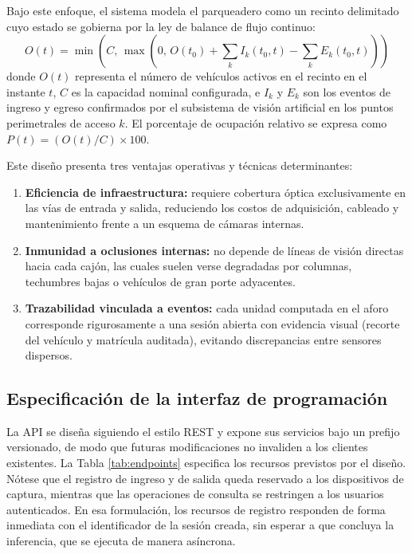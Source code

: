 Bajo este enfoque, el sistema modela el parqueadero como un recinto delimitado
cuyo estado se gobierna por la ley de balance de flujo continuo:
\begin{equation}
    O(t) = \min\left(C,\, \max\left(0,\, O(t_0) + \sum_{k} I_k(t_0, t) - \sum_{k} E_k(t_0, t)\right)\right)
\end{equation}
donde $O(t)$ representa el número de vehículos activos en el recinto en el
instante $t$, $C$ es la capacidad nominal configurada, e $I_k$ y $E_k$ son los
eventos de ingreso y egreso confirmados por el subsistema de visión artificial
en los puntos perimetrales de acceso $k$. El porcentaje de ocupación relativo se
expresa como $P(t) = (O(t) / C) \times 100$.

Este diseño presenta tres ventajas operativas y técnicas determinantes:
\begin{enumerate}
    \item \textbf{Eficiencia de infraestructura:} requiere cobertura óptica
        exclusivamente en las vías de entrada y salida, reduciendo los costos de
        adquisición, cableado y mantenimiento frente a un esquema de cámaras
        internas.
    \item \textbf{Inmunidad a oclusiones internas:} no depende de líneas de
        visión directas hacia cada cajón, las cuales suelen verse degradadas por
        columnas, techumbres bajas o vehículos de gran porte adyacentes.
    \item \textbf{Trazabilidad vinculada a eventos:} cada unidad computada en el
        aforo corresponde rigurosamente a una sesión abierta con evidencia
        visual (recorte del vehículo y matrícula auditada), evitando discrepancias
        entre sensores dispersos.
\end{enumerate}

\subsection{Especificación de la interfaz de programación}

La API se diseña siguiendo el estilo REST y expone sus servicios bajo un prefijo
versionado, de modo que futuras modificaciones no invaliden a los clientes
existentes. La Tabla \ref{tab:endpoints} especifica los recursos previstos por el
diseño. Nótese que el registro de ingreso y de salida queda reservado a los
dispositivos de captura, mientras que las operaciones de consulta se restringen
a los usuarios autenticados. En esa formulación, los recursos de registro
responden de forma inmediata con el identificador de la sesión creada, sin
esperar a que concluya la inferencia, que se ejecuta de manera asíncrona.

